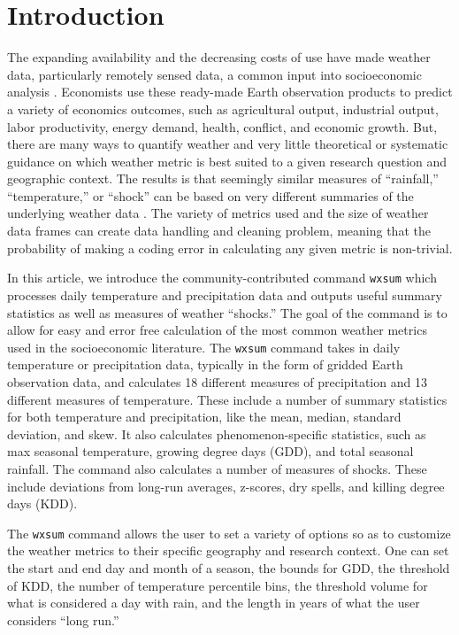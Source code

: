 
\section{Introduction}

The expanding availability and the decreasing costs of use have made weather data, particularly remotely sensed data, a common input into socioeconomic analysis \citep{Dell2014-rf, DonaldsonStoreygard16}. Economists use these ready-made Earth observation products to predict a variety of economics outcomes, such as agricultural output, industrial output, labor productivity,
energy demand, health, conflict, and economic growth. But, there are many ways to quantify weather and very little theoretical or systematic guidance on which weather metric is best suited to a given research question and geographic context. The results is that seemingly similar measures of ``rainfall,'' ``temperature,'' or ``shock'' can be based on very different summaries of the underlying weather data \citep{MichlerEtAl21WB}. The variety of metrics used and the size of weather data frames can create data handling and cleaning problem, meaning that the probability of making a coding error in calculating any given metric is non-trivial.

In this article, we introduce the community-contributed command \texttt{wxsum} which processes daily temperature and precipitation data and outputs useful summary statistics as well as measures of weather ``shocks.'' The goal of the command is to allow for easy and error free calculation of the most common weather metrics used in the socioeconomic literature. The \texttt{wxsum} command takes in daily temperature or precipitation data, typically in the form of gridded Earth observation data, and calculates 18 different measures of precipitation and 13 different measures of temperature. These include a number of summary statistics for both temperature and precipitation, like the mean, median, standard deviation, and skew. It also calculates phenomenon-specific statistics, such as max seasonal temperature, growing degree days (GDD), and total seasonal rainfall. The command also calculates a number of measures of shocks. These include deviations from long-run averages, z-scores, dry spells, and killing degree days (KDD).

The \texttt{wxsum} command allows the user to set a variety of options so as to customize the weather metrics to their specific geography and research context. One can set the start and end day and month of a season, the bounds for GDD, the threshold of KDD, the number of temperature percentile bins, the threshold volume for what is considered a day with rain, and the length in years of what the user considers ``long run.''

